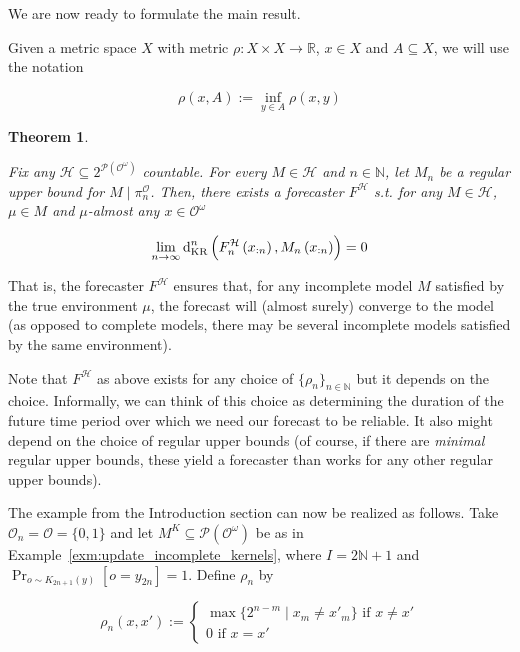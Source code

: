 \documentclass[aop,preprint]{imsart}
\numberwithin{equation}{section}
\theoremstyle{definition}
\theoremstyle{plain}
\newtheorem{theorem}{Theorem}[section]
\newcommand{\Nats}{\mathbb{N}}
\newcommand{\Reals}{\mathbb{R}}
\newcommand{\Sq}[2]{\{#1\}_{#2 \in \Nats}}
\newcommand{\Sqn}[1]{\Sq{#1}{n}}
\newcommand{\PM}{\mathcal{P}}
\newcommand{\DKR}{\operatorname{d}_{\textnormal{KR}}}
\newcommand{\Ob}{\mathcal{O}}
\newcommand{\OO}{\Ob^\omega}
\newcommand{\PO}{\pi^\Ob}
\newcommand{\PMO}{\PM(\OO)}
\newcommand{\MC}{\mathcal{H}}
\begin{document}
We are now ready to formulate the main result.

Given a metric space $X$ with metric $\rho: X \times X \rightarrow \Reals$, $x \in X$ and $A \subseteq X$, we will use the notation

\begin{equation}
\rho\left(x,A\right):=\inf_{y \in A} \rho\left(x,y\right)
\end{equation}

\begin{theorem}
\label{thm:main}

Fix any $\MC \subseteq 2^{\PMO}$ countable. For every $M \in \MC$ and $n \in \Nats$, let $M_n$ be a regular upper bound for $M \mid \PO_n$. Then, there exists a forecaster $F^\MC$ s.t. for any $M \in \MC$, $\mu \in M$ and $\mu$-almost any $x \in \OO$

\begin{equation}
\label{eqn:thm_main}
\lim_{n \rightarrow \infty} \DKR^n\left(F^\MC_n\left(x_{:n}\right),M_n\left(x_{:n}\right)\right) = 0
\end{equation}

\end{theorem}

That is, the forecaster $F^\MC$ ensures that, for any incomplete model $M$ satisfied by the true environment $\mu$, the forecast will (almost surely) converge to the model (as opposed to complete models, there may be several incomplete models satisfied by the same environment).

Note that $F^\MC$ as above exists for any choice of $\Sqn{\rho_n}$ but it depends on the choice. Informally, we can think of this choice as determining the duration of the future time period over which we need our forecast to be reliable. It also might depend on the choice of regular upper bounds (of course, if there are \emph{minimal} regular upper bounds, these yield a forecaster than works for any other regular upper bounds).

The example from the Introduction section can now be realized as follows. Take $\Ob_n=\Ob=\{0,1\}$ and let $M^K \subseteq \PMO$ be as in Example~\ref{exm:update_incomplete_kernels}, where $I = 2\Nats+1$ and $\Pr_{o\sim K_{2n+1}(y)}\left[o=y_{2n}\right]=1$. Define $\rho_n$  by

\begin{equation}
\rho_n(x,x'):=\begin{cases} \max\{2^{n-m} \mid x_{m} \ne x'_{m}\} \text{ if } x \ne x' \\ 0 \text{ if } x=x'\end{cases}
\end{equation}
\end{document}
